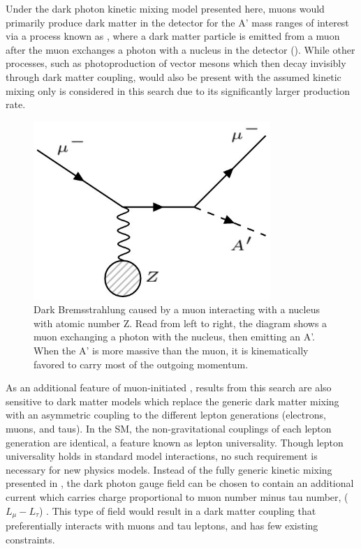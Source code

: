 Under the dark photon kinetic mixing model presented here, muons would primarily produce dark matter in the detector for the A' mass ranges of interest via a process known as \dbrem, where a dark matter particle is emitted from a muon after the muon exchanges a photon with a nucleus in the detector ().
While other processes, such as photoproduction of vector mesons which then decay invisibly through dark matter coupling, would also be present with the assumed kinetic mixing only \dbrem is considered in this search due to its significantly larger production rate.

\begin{figure}[ht]
	\centering
	\label{fig:dbrem_feyn}
	\includegraphics[width=0.8\textwidth]{figures/dbrem_feyn_diagram.jpg}
        \caption[Dark Bremsstrahlung Feynman Diagram]{Dark Bremsstrahlung caused by a muon interacting with a nucleus with atomic number Z. Read from left to right, the diagram shows a muon exchanging a photon with the nucleus, then emitting an A'. When the A' is more massive than the muon, it is kinematically favored to carry most of the outgoing momentum.}
\end{figure}

As an additional feature of muon-initiated \dbrem, results from this search are also sensitive to dark matter models which replace the generic dark matter mixing with an asymmetric coupling to the different lepton generations (electrons, muons, and taus).
In the SM, the non-gravitational couplings of each lepton generation are identical, a feature known as lepton universality.
Though lepton universality holds in standard model interactions, no such requirement is necessary for new physics models. 
Instead of the fully generic kinetic mixing presented in , the dark photon gauge field can be chosen to contain an additional current which carries charge proportional to muon number minus tau number, ($L_\mu - L_\tau$) \cite{neut_trident}.
This type of field would result in a dark matter coupling that preferentially interacts with muons and tau leptons, and has few existing constraints.

